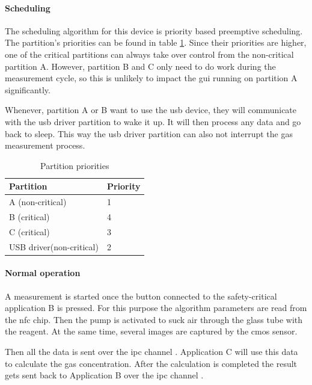\paragraph{Scheduling}
The scheduling algorithm for this device is priority based preemptive scheduling. The partition's priorities can be found in table \ref{table:gasdetect_priorities}. Since their priorities are higher, one of the critical partitions can always take over control from the non-critical partition A. However, partition B and C only need to do work during the measurement cycle, so this is unlikely to impact the \acrshort{gui} running on partition A significantly. 

Whenever, partition A or B want to use the \acrshort{usb} device, they will communicate with the \acrshort{usb} driver partition to wake it up. It will then process any data and go back to sleep. This way the \acrshort{usb} driver partition can also not interrupt the gas measurement process.

\begin{table}[h!]
\centering
\begin{tabular}{l|l}
\textbf{Partition} & \textbf{Priority} \\ \hline
A (non-critical)                             & 1                                           \\ \hline
B (critical)                                 & 4                                           \\ \hline
C (critical)                                 & 3                                           \\ \hline
USB driver(non-critical)                     & 2                                          
\end{tabular}
\caption{Partition priorities}
\label{table:gasdetect_priorities}
\end{table}

\paragraph{Normal operation}


A measurement is started once the button connected to the safety-critical application B is pressed. For this purpose the algorithm parameters are read from the \acrshort{nfc} chip. Then the pump is activated to suck air through the glass tube with the reagent. At the same time, several images are captured by the \acrshort{cmos} sensor.

Then all the data is sent over the \acrshort{ipc} channel \bToc. Application C will use this data to calculate the gas concentration. After the calculation is completed the result gets sent back to Application B over the \acrshort{ipc} channel \cTob.

